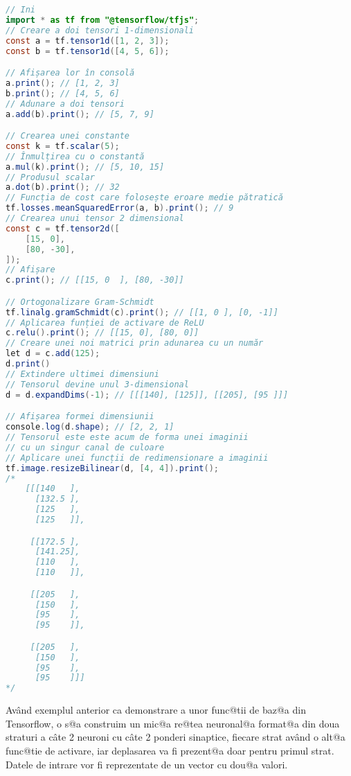 \begin{lstlisting}[language=Java, caption=Exemple de folosire a bibliotecii Tensorflow, label={lst:exemple-tensor}]
// Ini	
import * as tf from "@tensorflow/tfjs";
// Creare a doi tensori 1-dimensionali
const a = tf.tensor1d([1, 2, 3]);
const b = tf.tensor1d([4, 5, 6]);

// Afișarea lor în consolă
a.print(); // [1, 2, 3]
b.print(); // [4, 5, 6]
// Adunare a doi tensori
a.add(b).print(); // [5, 7, 9]

// Crearea unei constante
const k = tf.scalar(5);
// Înmulțirea cu o constantă
a.mul(k).print(); // [5, 10, 15]
// Produsul scalar
a.dot(b).print(); // 32
// Funcția de cost care folosește eroare medie pătratică
tf.losses.meanSquaredError(a, b).print(); // 9
// Crearea unui tensor 2 dimensional
const c = tf.tensor2d([
    [15, 0],
    [80, -30],
]);
// Afișare
c.print(); // [[15, 0  ], [80, -30]]

// Ortogonalizare Gram-Schmidt
tf.linalg.gramSchmidt(c).print(); // [[1, 0 ], [0, -1]]
// Aplicarea funției de activare de ReLU
c.relu().print(); // [[15, 0], [80, 0]]
// Creare unei noi matrici prin adunarea cu un număr
let d = c.add(125);
d.print()
// Extindere ultimei dimensiuni
// Tensorul devine unul 3-dimensional
d = d.expandDims(-1); // [[[140], [125]], [[205], [95 ]]]

// Afișarea formei dimensiunii
console.log(d.shape); // [2, 2, 1]
// Tensorul este este acum de forma unei imaginii
// cu un singur canal de culoare
// Aplicare unei funcții de redimensionare a imaginii
tf.image.resizeBilinear(d, [4, 4]).print();
/*
    [[[140   ],
      [132.5 ],
      [125   ],
      [125   ]],

     [[172.5 ],
      [141.25],
      [110   ],
      [110   ]],

     [[205   ],
      [150   ],
      [95    ],
      [95    ]],

     [[205   ],
      [150   ],
      [95    ],
      [95    ]]]
*/	
\end{lstlisting}

Av\^ and exemplul anterior ca demonstrare a unor func@tii de baz@a din Tensorflow, o s@a construim un mic@a re@tea neuronal@a format@a din doua straturi a c\^ ate 2 neuroni cu c\^ ate 2 ponderi sinaptice, fiecare strat av\^ and o alt@a func@tie de activare, iar deplasarea va fi prezent@a doar pentru primul strat. Datele de intrare vor fi reprezentate de un vector cu dou@a valori.

